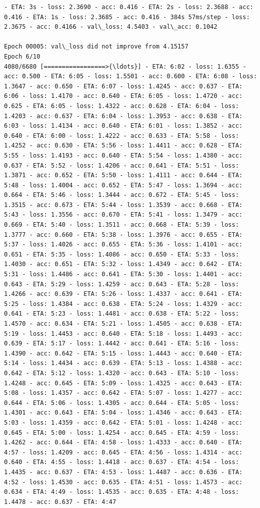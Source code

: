 \documentclass[11pt]{article}
\begin{document}
\begin{Verbatim}[commandchars=\\\{\}]
- ETA: 3s - loss: 2.3690 - acc: 0.416 - ETA: 2s - loss: 2.3688 - acc: 0.416 - ETA: 1s - loss: 2.3685 - acc: 0.416 - 384s 57ms/step - loss: 2.3675 - acc: 0.4166 - val\_loss: 4.5403 - val\_acc: 0.1042

Epoch 00005: val\_loss did not improve from 4.15157
Epoch 6/10
4080/6680 [=================>{\ldots}] - ETA: 6:02 - loss: 1.6355 - acc: 0.500 - ETA: 6:05 - loss: 1.5501 - acc: 0.600 - ETA: 6:08 - loss: 1.3647 - acc: 0.650 - ETA: 6:07 - loss: 1.4245 - acc: 0.637 - ETA: 6:06 - loss: 1.4170 - acc: 0.640 - ETA: 6:05 - loss: 1.4720 - acc: 0.625 - ETA: 6:05 - loss: 1.4322 - acc: 0.628 - ETA: 6:04 - loss: 1.4203 - acc: 0.637 - ETA: 6:04 - loss: 1.3953 - acc: 0.638 - ETA: 6:03 - loss: 1.4134 - acc: 0.640 - ETA: 6:01 - loss: 1.3852 - acc: 0.640 - ETA: 6:00 - loss: 1.4222 - acc: 0.633 - ETA: 5:58 - loss: 1.4252 - acc: 0.630 - ETA: 5:56 - loss: 1.4411 - acc: 0.628 - ETA: 5:55 - loss: 1.4193 - acc: 0.640 - ETA: 5:54 - loss: 1.4380 - acc: 0.637 - ETA: 5:52 - loss: 1.4206 - acc: 0.641 - ETA: 5:51 - loss: 1.3871 - acc: 0.652 - ETA: 5:50 - loss: 1.4111 - acc: 0.644 - ETA: 5:48 - loss: 1.4004 - acc: 0.652 - ETA: 5:47 - loss: 1.3694 - acc: 0.664 - ETA: 5:46 - loss: 1.3444 - acc: 0.672 - ETA: 5:45 - loss: 1.3515 - acc: 0.673 - ETA: 5:44 - loss: 1.3539 - acc: 0.668 - ETA: 5:43 - loss: 1.3556 - acc: 0.670 - ETA: 5:41 - loss: 1.3479 - acc: 0.669 - ETA: 5:40 - loss: 1.3511 - acc: 0.668 - ETA: 5:39 - loss: 1.3777 - acc: 0.660 - ETA: 5:38 - loss: 1.3976 - acc: 0.655 - ETA: 5:37 - loss: 1.4026 - acc: 0.655 - ETA: 5:36 - loss: 1.4101 - acc: 0.651 - ETA: 5:35 - loss: 1.4086 - acc: 0.650 - ETA: 5:33 - loss: 1.4030 - acc: 0.651 - ETA: 5:32 - loss: 1.4349 - acc: 0.642 - ETA: 5:31 - loss: 1.4486 - acc: 0.641 - ETA: 5:30 - loss: 1.4401 - acc: 0.643 - ETA: 5:29 - loss: 1.4259 - acc: 0.643 - ETA: 5:28 - loss: 1.4266 - acc: 0.639 - ETA: 5:26 - loss: 1.4337 - acc: 0.641 - ETA: 5:25 - loss: 1.4384 - acc: 0.638 - ETA: 5:24 - loss: 1.4329 - acc: 0.641 - ETA: 5:23 - loss: 1.4481 - acc: 0.638 - ETA: 5:22 - loss: 1.4570 - acc: 0.634 - ETA: 5:21 - loss: 1.4505 - acc: 0.638 - ETA: 5:19 - loss: 1.4453 - acc: 0.640 - ETA: 5:18 - loss: 1.4493 - acc: 0.639 - ETA: 5:17 - loss: 1.4442 - acc: 0.641 - ETA: 5:16 - loss: 1.4390 - acc: 0.642 - ETA: 5:15 - loss: 1.4443 - acc: 0.640 - ETA: 5:14 - loss: 1.4434 - acc: 0.639 - ETA: 5:13 - loss: 1.4388 - acc: 0.642 - ETA: 5:12 - loss: 1.4320 - acc: 0.643 - ETA: 5:10 - loss: 1.4248 - acc: 0.645 - ETA: 5:09 - loss: 1.4325 - acc: 0.643 - ETA: 5:08 - loss: 1.4357 - acc: 0.642 - ETA: 5:07 - loss: 1.4277 - acc: 0.644 - ETA: 5:06 - loss: 1.4305 - acc: 0.644 - ETA: 5:05 - loss: 1.4301 - acc: 0.643 - ETA: 5:04 - loss: 1.4346 - acc: 0.643 - ETA: 5:03 - loss: 1.4359 - acc: 0.642 - ETA: 5:01 - loss: 1.4248 - acc: 0.645 - ETA: 5:00 - loss: 1.4254 - acc: 0.645 - ETA: 4:59 - loss: 1.4262 - acc: 0.644 - ETA: 4:58 - loss: 1.4333 - acc: 0.640 - ETA: 4:57 - loss: 1.4209 - acc: 0.645 - ETA: 4:56 - loss: 1.4314 - acc: 0.640 - ETA: 4:55 - loss: 1.4418 - acc: 0.637 - ETA: 4:54 - loss: 1.4435 - acc: 0.637 - ETA: 4:53 - loss: 1.4487 - acc: 0.636 - ETA: 4:52 - loss: 1.4530 - acc: 0.635 - ETA: 4:51 - loss: 1.4573 - acc: 0.634 - ETA: 4:49 - loss: 1.4535 - acc: 0.635 - ETA: 4:48 - loss: 1.4478 - acc: 0.637 - ETA: 4:47 
\end{Verbatim}
\end{document}

